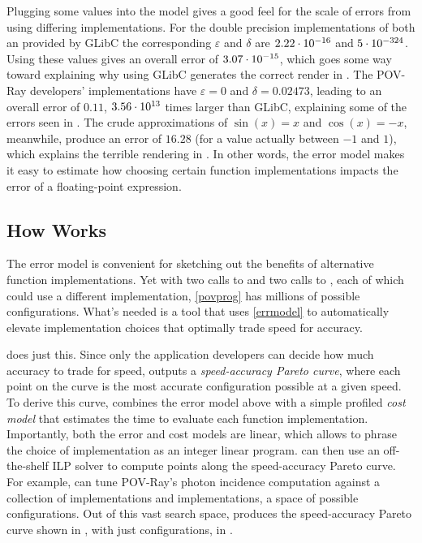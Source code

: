 \documentclass[paper.tex]{subfiles}
\begin{document}
Plugging some values into the model gives a good feel
  for the scale of errors from using differing implementations.
For the double precision implementations of both  an  provided by
  GLibC the corresponding $\varepsilon$ and $\delta$ are
  $2.22 \cdot 10^{-16}$ and $5 \cdot 10^{-324}$.
Using these values gives an overall error of $3.07 \cdot 10^{-15}$,
  which goes some way toward explaining
  why using GLibC generates the correct render in .
The POV-Ray developers' implementations
  have $\varepsilon = 0$ and $\delta = 0.02473$,
  leading to an overall error of $0.11$,
  $3.56 \cdot 10^{13}$ times larger than GLibC,
  explaining some of the errors seen in .
The crude approximations of $\sin(x) = x$ and $\cos(x) = -x$,
  meanwhile, produce an error of $16.28$
  (for a value actually between $-1$ and $1$),
  which explains the terrible rendering in .
In other words, the error model makes it easy
  to estimate how choosing certain function implementations
  impacts the error of a floating-point expression.

\subsection{How \name Works}

The error model is convenient
  for sketching out the benefits of alternative function implementations.
Yet with two calls to  and two calls to ,
  each of which could use a different implementation,
  \cref{povprog} has millions of possible configurations.
What's needed is a tool that uses \cref{errmodel}
  to automatically elevate implementation choices
  that optimally trade speed for accuracy.

\name does just this.
Since only the application developers can decide
  how much accuracy to trade for speed,
  \name outputs a \textit{speed-accuracy Pareto curve},
  where each point on the curve
  is the most accurate configuration possible at a given speed.
To derive this curve,
  \name combines the error model above
  with a simple profiled \textit{cost model}
  that estimates the time to evaluate each function implementation.
Importantly, both the error and cost models are linear,
  which allows \name to phrase the choice of implementation
  as an integer linear program.
\name can then use an off-the-shelf ILP solver
  to compute points along the speed-accuracy Pareto curve.
For example, \name can tune POV-Ray's photon incidence computation
  against a collection of \nSinImpls {} implementations
  and \nCosImpls {} implementations,
  a space of \nPovRayPossible possible configurations.
Out of this vast search space,
  \name produces the speed-accuracy Pareto curve
  shown in ,
  with just \nPovProgConfigs configurations,
  in \nPovProgOptunerTime.
\end{document}
